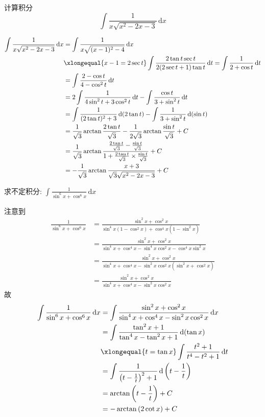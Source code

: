 \documentclass[color=green,titlestyle=hang]{elegantbook}%
\begin{document}
\begin{exercise}计算积分\begin{equation*}\int \frac{1}{x\sqrt{x^2-2x-3}}\,\mathrm{d}x\end{equation*}\end{exercise}
\begin{Solution}
\begin{align*}\int \frac{1}{x\sqrt{x^2-2x-3}}\,\mathrm{d}x&=\int \frac{1}{x\sqrt{(x-1)^2-4}}\,\mathrm{d}x\\
&\xlongequal{x-1=2\sec t}\int \frac{2\tan t\sec t}{2(2\sec t+1)\tan t}\,\mathrm{d}t=\int \frac{1}{2+\cos t}\,\mathrm{d}t\\
&=\int \frac{2-\cos t}{4-\cos^2 t}\,\mathrm{d}t\\
&=2\int \frac{1}{4\sin^2t+3\cos^2 t}\,\mathrm{d}t-\int \frac{\cos t}{3+\sin^2 t}\,\mathrm{d}t\\
&=\int \frac{1}{(2\tan t)^2+3}\,\mathrm{d}(2\tan t)-\int \frac{1}{3+\sin^2 t}\,\mathrm{d}(\sin t)\\
&=\frac{1}{\sqrt{3}}\arctan\frac{2\tan t}{\sqrt{3}}-\frac{1}{2\sqrt{3}}\arctan\frac{\sin t}{\sqrt{3}}+C\\
&=\frac{1}{\sqrt{3}}\arctan\frac{\frac{2\tan t}{\sqrt{3}}-\frac{\sin t}{\sqrt{3}}}{1+\frac{2\tan t}{\sqrt{3}}\times\frac{\sin t}{\sqrt{3}}}+C\\
&=-\frac{1}{\sqrt{3}}\arctan\frac{x+3}{\sqrt{3}\sqrt{x^2-2x-3}}+C
\end{align*}		
\end{Solution}

\begin{exercise}
求不定积分: $\int\frac{1}{\sin^6x+\cos^6x}\,\mathrm{d}x$
\end{exercise}\begin{Solution} 
注意到\begin{align*}
\frac{1}{\sin^6x+\cos^6x}&=\frac{\sin^2x+\cos^2x}{\sin^4x(1-\cos^2x)+\cos^4x(1-\sin^2x)}\\
&=\frac{\sin^2x+\cos^2x}{\sin^4x+\cos^4x-\sin^4x\cos^2x-\cos^4x\sin^2x}\\
&=\frac{\sin^2x+\cos^2x}{\sin^4x+\cos^4x-\sin^2x\cos^2x(\sin^2x+\cos^2x)}\\
&=\frac{\sin^2x+\cos^2x}{\sin^4x+\cos^4x-\sin^2x\cos^2x}
\end{align*}
故\begin{align*}
\int\frac{1}{\sin^6x+\cos^6x}\,\mathrm{d}x&=\int\frac{\sin^2x+\cos^2x}{\sin^4x+\cos^4x-\sin^2x\cos^2x}\,\mathrm{d}x\\
&=\int\frac{\tan^2x+1}{\tan^4x-\tan^2x+1}\,\mathrm{d}(\tan x)\\
&\xlongequal{t=\tan x}\int\frac{t^2+1}{t^4-t^2+1}\,\mathrm{d}t\\
&=\int\frac{1}{\left(t-\frac{1}{t}\right)^2+1}\,\mathrm{d}\left(t-\frac{1}{t}\right)\\
&=\arctan\left(t-\frac{1}{t}\right)+C\\
&=-\arctan\left(2\cot x\right)+C
\end{align*}	
\end{Solution}
\end{document}
